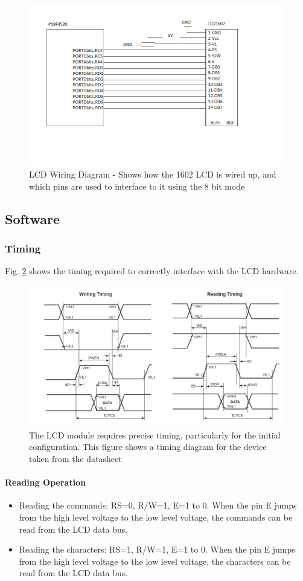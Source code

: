 \documentclass[]{report}
\begin{document}
\begin{figure}
\centering
\includegraphics[width=0.7\linewidth]{"../Diagrams/LCD Pin Wiring Diagram"}
\caption{LCD Wiring Diagram - Shows how the 1602 LCD is wired up, and which pins are used to interface to it using the 8 bit mode}
\label{fig:LCDPinWiringDiagram}
\end{figure}

\subsection{Software}
\subsubsection{Timing}
Fig. \ref{fig:LCDTiming} shows the timing required to correctly interface with the LCD hardware.
\begin{figure}
\centering
\includegraphics[width=0.7\linewidth]{"../Diagrams/LCD Timing"}
\caption{The LCD module requires precise timing, particularly for the initial configuration. This figure shows a timing diagram for the device taken from the datasheet}
\label{fig:LCDTiming}
\end{figure}

\paragraph{Reading Operation}
\begin{itemize}
	\item Reading the commands: RS=0, R/W=1, E=1 to 0. When the pin E jumps from the high level voltage to the low level voltage, the commands can be read from the LCD data bus.
	\item Reading the characters: RS=1, R/W=1, E=1 to 0. When the pin E jumps from the high level voltage to the low level voltage, the characters can be read from the LCD data bus.
\end{itemize}
\end{document}
